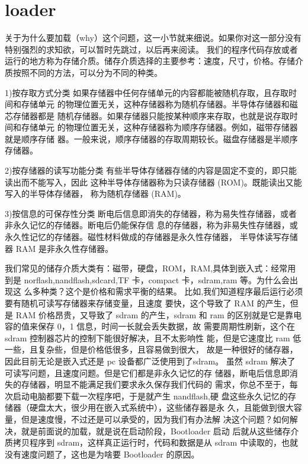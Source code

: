 \section{loader}
关于为什么要加载（why）这个问题，这一小节就来细说。如果你对这一部分没有特别强烈的求知欲，可以暂时先跳过，以后再来阅读。
我们的程序代码存放或者运行的地方称为存储介质。储存介质选择的主要参考：速度，尺寸，价格。存储介质按照不同的方法，可以分为不同的种类。

1)按存取方式分类
如果存储器中任何存储单元的内容都能被随机存取，且存取时间和存储单元
的物理位置无关，这种存储器称为随机存储器。半导体存储器和磁芯存储器都是
随机存储器。如果存储器只能按某种顺序来存取，也就是说存取时间和存储单元
的物理位置无关，这种存储器称为顺序存储器。例如，磁带存储器就是顺序存储
器。一般来说，顺序存储器的存取周期较长。磁盘存储器是半顺序存储器。

2)按存储器的读写功能分类
有些半导体存储器存储的内容是固定不变的，即只能读出而不能写入，因此
这种半导体存储器称为只读存储器 (ROM)。既能读出又能写入的半导体存储器，
称为随机存储器 (RAM)。

3)按信息的可保存性分类
断电后信息即消失的存储器，称为易失性存储器，或者非永久记忆的存储器。断电后仍能保存信
息的存储器，称为非易失性存储器，或永久性记忆的存储器。磁性材料做成的存储器是永久性存储器，
半导体读写存储器 RAM 是非永久性存储器。

我们常见的储存介质大类有：磁带，硬盘，ROM，RAM,具体到嵌入式：经常用到是
norflash,nandflash,sdcard,TF 卡，compact 卡，sdram,ram 等。为什么会出现这
么多种类？这个是价格和需求平衡的结果。
比如,我们知道程序最后运行必须要有随机可读写存储器来存储变量，且速度
要快，这个导致了 RAM 的产生，但是 RAM 价格昂贵，又导致了 sdram 的产生，sdram
和 ram 的区别就是它是靠电容的值来保存 0，1 信息，时间一长就会丢失数据，故
需要周期性刷新，这个在 sdram 控制器芯片的控制下能很好解决，且不太影响性
能，但是它速度比 ram 低一些，且复杂些，但是价格低很多，且容易做到很大，
故是一种很好的储存器，因此目前无论是嵌入式还是 pc 设备都广泛使用到了sdram。
虽然 sdram 解决了可读写问题，且速度问题。但是它们都是非永久记忆的存
储器，断电后信息即消失的存储器，明显不能满足我们要求永久保存我们代码的
需求，你总不至于，每次启动电脑都要下载一次程序吧，于是就产生 nandflash,硬
盘这些永久记忆的存储器（硬盘太大，很少用在嵌入式系统中），这些储存器是永
久，且能做到很大容量，但是速度慢，不过还是可以承受的，因为我们有办法解
决这个问题？如何解决，就是前面说的加载，就是说在启动阶段，Bootloader 启动
后就从这些储存介质拷贝程序到 sdram，这样真正运行时，代码和数据是从 sdram
中读取的，也就没有速度问题了，这也是为啥要 Bootloader 的原因。

